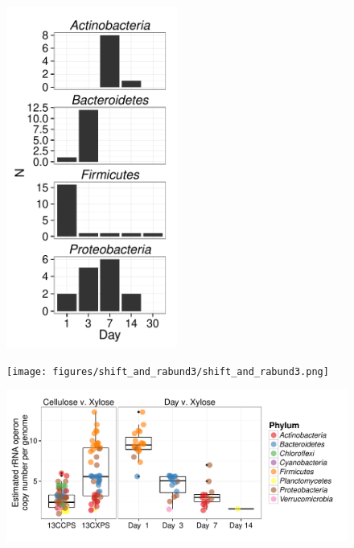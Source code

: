 \begin{figure}[H]
	\begin{center}
	\centerline{\includegraphics[width=0.50\textwidth]{figures/xylose_rspndr_bar/xylose_rspndr_bar.pdf}}
	\caption{\protect}\label{fig:xyl_count}
        \end{center}
\end{figure}

\begin{figure}[H]
	\begin{center}
	\centerline{\texttt{[image: figures/shift\_and\_rabund3/shift\_and\_rabund3.png]}}
	\caption{\protect}\label{fig:shift}
    \end{center}
\end{figure}

\begin{figure}[H]
	\begin{center}
	\centerline{\includegraphics[width=\textwidth]{figures/copy_number/copy_number.pdf}}
	\caption{\protect}\label{fig:copy}
        \end{center}
\end{figure}

\restoregeometry
